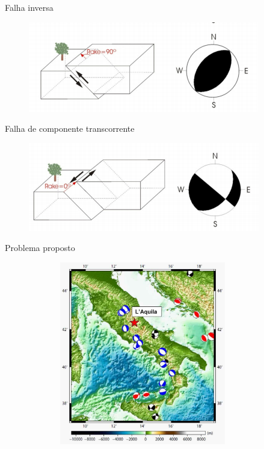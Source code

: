 \documentclass{beamer}
\begin{document}
\begin{frame}{Falha inversa}
	\begin{figure}[htb]
		\centering
		\includegraphics[scale=0.9]{inversa}
	\end{figure}
\end{frame}

\begin{frame}{Falha de componente transcorrente}
	\begin{figure}[htb]
		\centering
		\includegraphics[scale=0.9]{transcorrente}
	\end{figure}
\end{frame}


\begin{frame}{Problema proposto}
	\begin{figure}[htb]
		\centering
		\includegraphics[width= 10cm, height= 8cm]{problema_geral}
	\end{figure}
\end{frame}
\end{document}
